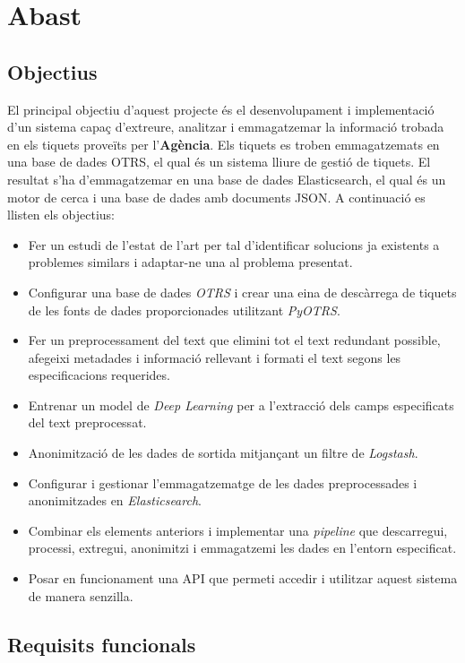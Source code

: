 \section{Abast}

\subsection{Objectius} \label{ssec:objectius}

El principal objectiu d'aquest projecte és el desenvolupament i implementació d'un sistema capaç d'extreure, analitzar i emmagatzemar la informació trobada en els tiquets proveïts per l'\textbf{Agència}. Els tiquets es troben emmagatzemats en una base de dades OTRS, el qual és un sistema lliure de gestió de tiquets. El resultat s'ha d'emmagatzemar en una base de dades Elasticsearch, el qual és un motor de cerca i una base de dades amb documents JSON. A continuació es llisten els objectius:

\begin{itemize}
    \item Fer un estudi de l'estat de l'art per tal d'identificar solucions ja existents a problemes similars i adaptar-ne una al problema presentat.
    \item Configurar una base de dades \textit{OTRS} i crear una eina de descàrrega de tiquets de les fonts de dades proporcionades utilitzant \textit{PyOTRS}.
    \item Fer un preprocessament del text que elimini tot el text redundant possible, afegeixi metadades i informació rellevant i formati el text segons les especificacions requerides.
    \item Entrenar un model de \textit{Deep Learning} per a l'extracció dels camps especificats del text preprocessat.
    \item Anonimització de les dades de sortida mitjançant un filtre de \textit{Logstash}.
    \item Configurar i gestionar l'emmagatzematge de les dades preprocessades i anonimitzades en \textit{Elasticsearch}.
    \item Combinar els elements anteriors i implementar una \textit{pipeline} que descarregui, processi, extregui, anonimitzi i emmagatzemi les dades en l'entorn especificat.
    \item Posar en funcionament una API que permeti accedir i utilitzar aquest sistema de manera senzilla.
\end{itemize}


\subsection{Requisits funcionals}

